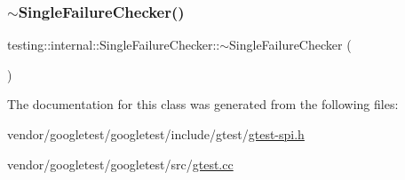 \mbox{\label{classtesting_1_1internal_1_1_single_failure_checker_a4b0a907c9c1b350c79d70af138e9f0bf}} 
\subsubsection{\texorpdfstring{$\sim$\+Single\+Failure\+Checker()}{~SingleFailureChecker()}}
{\footnotesize\ttfamily testing\+::internal\+::\+Single\+Failure\+Checker\+::$\sim$\+Single\+Failure\+Checker (\begin{DoxyParamCaption}{ }\end{DoxyParamCaption})}



The documentation for this class was generated from the following files\+:\begin{DoxyCompactItemize}
\item 
vendor/googletest/googletest/include/gtest/\hyperlink{gtest-spi_8h}{gtest-\/spi.\+h}\item 
vendor/googletest/googletest/src/\hyperlink{gtest_8cc}{gtest.\+cc}\end{DoxyCompactItemize}
